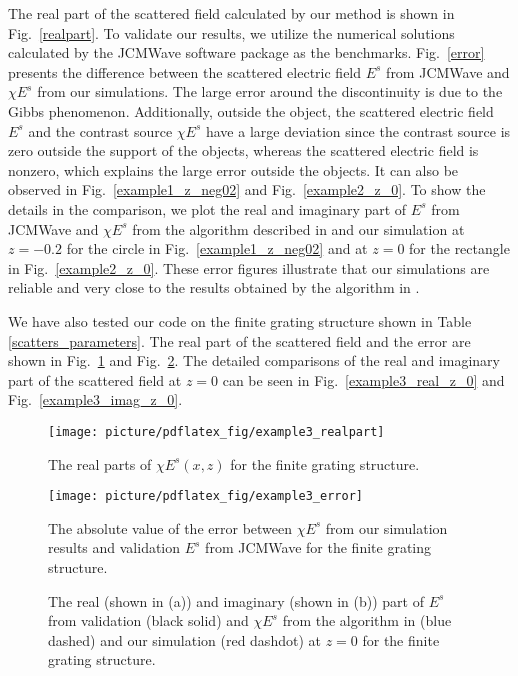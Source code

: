 \documentclass[preprint,12pt]{elsarticle}
\begin{document}
 The real part of the scattered field calculated by our method is shown in Fig.~\ref{realpart}. 
 To validate our results, we utilize the numerical solutions calculated by the JCMWave software package \cite{Burger2013Finite} as the benchmarks. Fig.~\ref{error} presents the difference between the scattered electric field $E^s$ from JCMWave and $\chi E^s$ from our simulations. The large error around the discontinuity is due to the Gibbs phenomenon. Additionally, outside the object, the scattered electric field $E^s$ and the contrast source $\chi E^s$ have a large deviation since the contrast source is zero outside the support of the objects, whereas the scattered electric field is nonzero, which explains the large error outside the objects. It can also be observed in Fig.~\ref{example1_z_neg02} and Fig.~\ref{example2_z_0}. To show the details in the comparison, we plot the real and imaginary part of $E^s$ from JCMWave and $\chi E^s$ from the algorithm described in \cite{Dilz2016The} and our simulation at $z = -0.2$ for the circle in Fig.~\ref{example1_z_neg02} and {at} $z = 0$ for the rectangle in Fig.~\ref{example2_z_0}. 
 These error figures illustrate that our simulations {are} reliable and very {close} to the results obtained by the algorithm in \cite{Dilz2016The}. 


 We have also tested our code on the finite grating structure shown in Table \ref{scatters_parameters}. The real part of the scattered field and the error are shown in Fig.~\ref{example3_realpart} and Fig.~\ref{example3_error}. The detailed comparisons of the real and imaginary part of the scattered field at $z=0$ can be seen in Fig.~\ref{example3_real_z_0} and Fig.~\ref{example3_imag_z_0}. 
 \begin{figure}[htb]
 \centering
  \texttt{[image: picture/pdflatex\_fig/example3\_realpart]}
 \caption{The real parts of $\chi E^s (x,z)$ for the finite grating structure.}
 \label{example3_realpart}
 \end{figure}

 \begin{figure}[!h]
 \centering
  \texttt{[image: picture/pdflatex\_fig/example3\_error]}
 \caption{The absolute value of the error between $\chi E^s$ from our simulation results and validation $E^s$ from JCMWave for the finite grating structure.}
 \label{example3_error}
 \end{figure}

 \begin{figure}[!h]
 \centering {} 
 \caption{The real (shown in (a)) and imaginary (shown in (b)) part of $E^s$ from validation (black solid) and $\chi E^s$ from the algorithm in \cite{Dilz2016The} (blue dashed) and our simulation (red dashdot) at $z = 0$ for the finite grating structure.}
 \label{example3_z_0}
 \end{figure}
\end{document}
